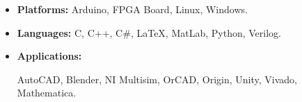 \begin{itemize}
    \item 
    \textbf{Platforms:} Arduino, FPGA Board, Linux, Windows.
    \item 
    \textbf{Languages:} C, C++, C\#, \LaTeX, MatLab, Python, Verilog.
    \item 
    \textbf{Applications:} 
    \begin{minipage}[t]{\skillwidth}
        AutoCAD, Blender, NI Multisim, OrCAD, Origin, 
        Unity, Vivado, Mathematica.
    \end{minipage}
\end{itemize}
